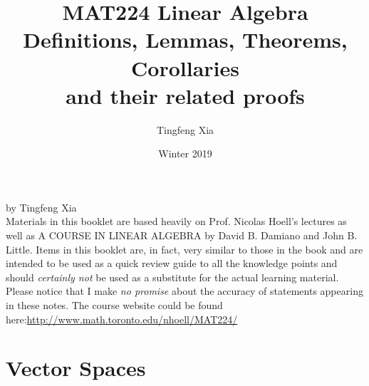 \documentclass[oneside, 12pt]{book}
\title{%
  \textbf{MAT224 Linear Algebra}\\
  \large Definitions, Lemmas, Theorems, Corollaries \\
    and their related proofs}
\author{Tingfeng Xia}
\date{Winter 2019}
\newcommand{\tit}[1]{\textit{#1}}
\begin{document}
\maketitle
\newpage %
\mbox{}
\vfill
by Tingfeng Xia \\


Materials in this booklet are based heavily on Prof. Nicolas Hoell's lectures as well as A COURSE IN LINEAR ALGEBRA by David B. Damiano and John B. Little.\newline\newline
Items in this booklet are, in fact, very similar to those in the book and are intended to be used as a quick review guide to all the knowledge points and should \tit{certainly not} be used as a substitute for the actual learning material. Please notice that I make\tit{ no promise} about the accuracy of statements appearing in these notes.\newline\newline
The course website could be found here:\newline \url{http://www.math.toronto.edu/nhoell/MAT224/}
\newpage
\tableofcontents

\chapter{Vector Spaces}
\end{document}
